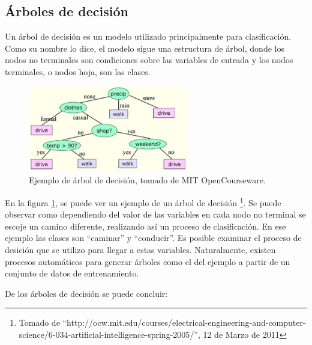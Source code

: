 \documentclass[a4paper, 11pt, oneside]{report}
\begin{document}
\subsection{Árboles de decisión}

Un árbol de decisión es un modelo utilizado principalmente para clasificación. Como su nombre lo dice, el modelo sigue una estructura de árbol, donde los nodos no terminales son condiciones sobre las variables de entrada y los nodos terminales, o nodos hoja, son las clases.

	\begin{figure}[htb]
	\begin{center}
	\leavevmode
	\includegraphics[width=7cm]{img/decisiontree.jpg}
	\end{center}
	\caption{Ejemplo de árbol de decisión, tomado de MIT OpenCourseware.}
	\label{fig:decisionTree}
	\end{figure}

En la figura \ref{fig:decisionTree}, se puede ver un ejemplo de un árbol de decisión \footnote{Tomado de ``http://ocw.mit.edu/courses/electrical-engineering-and-computer-science/6-034-artificial-intelligence-spring-2005/'', 12 de Marzo de 2011}. Se puede observar como dependiendo del valor de las variables en cada nodo no terminal se escoje un camino diferente, realizando así un proceso de clasificación. En ese ejemplo las clases son ``caminar'' y ``conducir''. Es posible examinar el proceso de desición que se utilizo para llegar a estas variables. Naturalmente, existen procesos automáticos para generar árboles como el del ejemplo a partir de un conjunto de datos de entrenamiento.

De los árboles de decisión se puede concluir:
\end{document}
